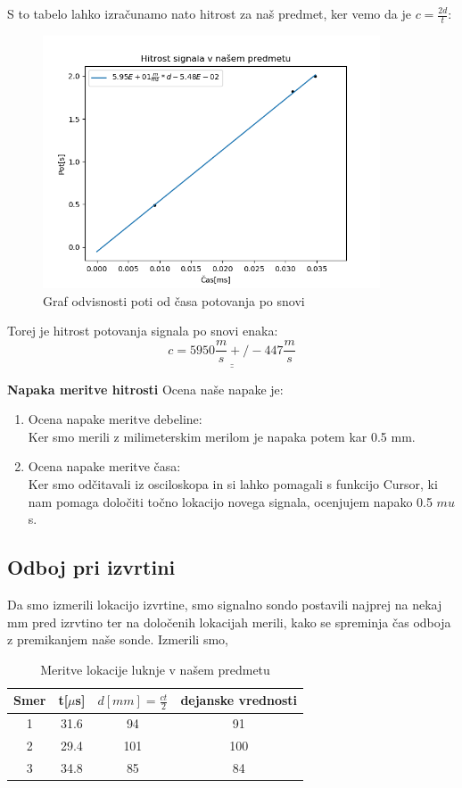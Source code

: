 \documentclass[11pt, a4paper]{article}
\theoremstyle{definition}
\theoremstyle{example}
\theoremstyle{izrek}
\begin{document}
S to tabelo lahko izračunamo nato hitrost za naš predmet, ker vemo da je $c=\frac{2d}{t}$:

\begin{figure}[htp]
    \centering
    \includegraphics[width=10cm]{Hitrost.png}
    \caption{Graf odvisnosti poti od časa potovanja po snovi}
\end{figure}
Torej je hitrost potovanja signala po snovi enaka:
$$\underline{\underline{c=5950 \frac{m}{s} +/- 447 \frac{m}{s}}}$$

\pagebreak
\textbf{Napaka meritve hitrosti}
Ocena naše napake je:
\begin{enumerate}
\item Ocena napake meritve debeline:\\
Ker smo merili z milimeterskim merilom je napaka potem kar 0.5 mm. 
\item Ocena napake meritve časa: \\
Ker smo odčitavali iz osciloskopa in si lahko pomagali s funkcijo Cursor, ki nam pomaga določiti točno lokacijo novega signala, ocenjujem napako 0.5 $mu$s. 
\end{enumerate}

\subsection{Odboj pri izvrtini}
Da smo izmerili lokacijo izvrtine, smo signalno sondo postavili najprej na nekaj mm pred izrvtino ter na določenih lokacijah merili, kako se spreminja čas odboja z premikanjem naše sonde.
Izmerili smo, \begin{table}[ht]
	\centering
	\begin{tabular}{|c|c|c|c|}
		\hline
		Smer & t[$\mu$s] &  $d [mm]=\frac{ct}{2}$ & dejanske vrednosti\\
		\hline
		\hline
		1 & 31.6 & 94 & 91\\
		\hline
		2 & 29.4 & 101 & 100\\
		\hline
		3 & 34.8 & 85 & 84\\
		\hline
		\end{tabular}
		\caption{Meritve lokacije luknje v našem predmetu}
		\label{tab:FirstTable}
\end{table}
\end{document}

